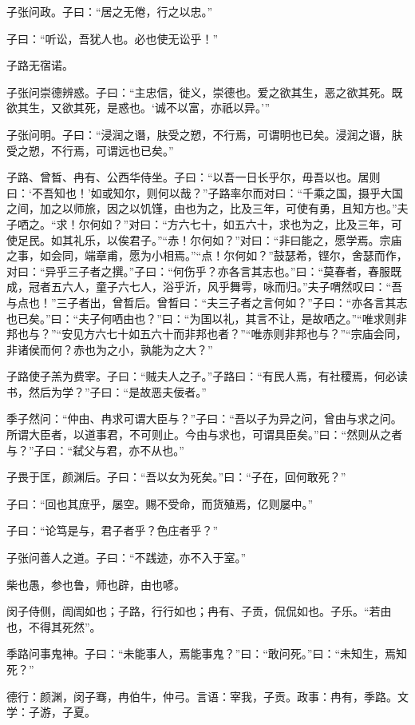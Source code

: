 \documentclass[a5paper]{ctexbook}
\begin{document}
    子张问政。子曰：“居之无倦，行之以忠。”

    子曰：“听讼，吾犹人也。必也使无讼乎！”

    子路无宿诺。

    子张问崇德辨惑。子曰：“主忠信，徙义，崇德也。爱之欲其生，恶之欲其死。既欲其生，又欲其死，是惑也。‘诚不以富，亦祇以异。’”

    子张问明。子曰：“浸润之谮，肤受之愬，不行焉，可谓明也已矣。浸润之谮，肤受之愬，不行焉，可谓远也已矣。”

    子路、曾晳、冉有、公西华侍坐。子曰：“以吾一日长乎尔，毋吾以也。居则曰：‘不吾知也！’如或知尔，则何以哉？”子路率尔而对曰：“千乘之国，摄乎大国之间，加之以师旅，因之以饥馑，由也为之，比及三年，可使有勇，且知方也。”夫子哂之。“求！尔何如？”对曰：“方六七十，如五六十，求也为之，比及三年，可使足民。如其礼乐，以俟君子。”“赤！尔何如？”对曰：“非曰能之，愿学焉。宗庙之事，如会同，端章甫，愿为小相焉。”“点！尔何如？”鼓瑟希，铿尔，舍瑟而作，对曰：“异乎三子者之撰。”子曰：“何伤乎？亦各言其志也。”曰：“莫春者，春服既成，冠者五六人，童子六七人，浴乎沂，风乎舞雩，咏而归。”夫子喟然叹曰：“吾与点也！”三子者出，曾晳后。曾晳曰：“夫三子者之言何如？”子曰：“亦各言其志也已矣。”曰：“夫子何哂由也？”曰：“为国以礼，其言不让，是故哂之。”“唯求则非邦也与？”“安见方六七十如五六十而非邦也者？”“唯赤则非邦也与？”“宗庙会同，非诸侯而何？赤也为之小，孰能为之大？”

    子路使子羔为费宰。子曰：“贼夫人之子。”子路曰：“有民人焉，有社稷焉，何必读书，然后为学？”子曰：“是故恶夫佞者。”

    季子然问：“仲由、冉求可谓大臣与？”子曰：“吾以子为异之问，曾由与求之问。所谓大臣者，以道事君，不可则止。今由与求也，可谓具臣矣。”曰：“然则从之者与？”子曰：“弑父与君，亦不从也。”

    子畏于匡，颜渊后。子曰：“吾以女为死矣。”曰：“子在，回何敢死？”

    子曰：“回也其庶乎，屡空。赐不受命，而货殖焉，亿则屡中。”

    子曰：“论笃是与，君子者乎？色庄者乎？”

    子张问善人之道。子曰：“不践迹，亦不入于室。”

    柴也愚，参也鲁，师也辟，由也喭。

    闵子侍侧，訚訚如也；子路，行行如也；冉有、子贡，侃侃如也。子乐。“若由也，不得其死然”。

    季路问事鬼神。子曰：“未能事人，焉能事鬼？”曰：“敢问死。”曰：“未知生，焉知死？”

    德行：颜渊，闵子骞，冉伯牛，仲弓。言语：宰我，子贡。政事：冉有，季路。文学：子游，子夏。
\end{document}
